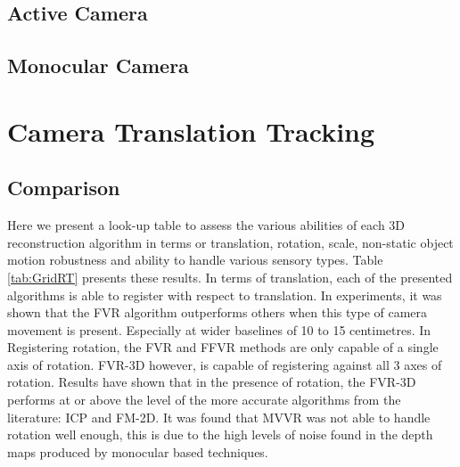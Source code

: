 \subsection{Active Camera}
\label{ActiveSOTA}


\subsection{Monocular Camera}
\label{Sec:MonocularSOTA}


\section{Camera Translation Tracking}
\label{Sec:CamTransTrackExp}


\subsection{Comparison}

\begin{table}
\label{tab:GridRT}
\caption{FVR Comparison Table}
\end{table}


Here we present a look-up table to assess the various abilities of each 3D reconstruction algorithm in terms or translation, rotation, scale, non-static object motion robustness and ability to handle various sensory types. Table \ref{tab:GridRT} presents these results. In terms of translation, each of the presented algorithms is able to register with respect to translation. In experiments, it was shown that the FVR algorithm outperforms others when this type of camera movement is present. Especially at wider baselines of 10 to 15 centimetres. In Registering rotation, the FVR and FFVR methods are only capable of a single axis of rotation. FVR-3D however, is capable of registering against all 3 axes of rotation. Results have shown that in the presence of rotation, the FVR-3D performs at or above the level of the more accurate algorithms from the literature: ICP and FM-2D. It was found that MVVR was not able to handle rotation well enough, this is due to the high levels of noise found in the depth maps produced by monocular based techniques. \\

